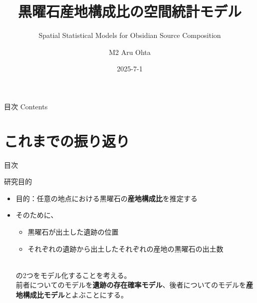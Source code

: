 \documentclass[xelatex, 8pt]{beamer}
\title[Contact: Aru Ohta (otaru1214@gmail.com)]{黒曜石産地構成比の空間統計モデル}
\subtitle{Spatial Statistical Models for Obsidian Source Composition}
\date[2025]{2025-7-1}
\author[M2 Aru Ohta]{M2 Aru Ohta}
\institute[Kyoto University]{京都大学情報学研究科}
\theoremstyle{plain}
\theoremstyle{definition}
\begin{document}
\frame{\titlepage}

\begin{frame}
{\Large 目次 Contents}
 \tableofcontents
\end{frame}

\section{これまでの振り返り}

\begin{frame}
{\Large 目次}
 \tableofcontents[currentsection]
\end{frame}

\begin{frame}{研究目的}

    \begin{itemize}
        \item 目的：任意の地点における黒曜石の\textbf{産地構成比}を推定する
        \\[2mm]
        \item そのために、
        \\[2mm]
            \begin{itemize}
                \item 黒曜石が出土した遺跡の位置
                \item それぞれの遺跡から出土したそれぞれの産地の黒曜石の出土数
            \end{itemize}
            \\[2mm]
            の2つをモデル化することを考える。
            \\[2mm]
            前者についてのモデルを\textbf{遺跡の存在確率モデル}、後者についてのモデルを\textbf{産地構成比モデル}とよぶことにする。

    \end{itemize}

\end{frame}
\end{document}
